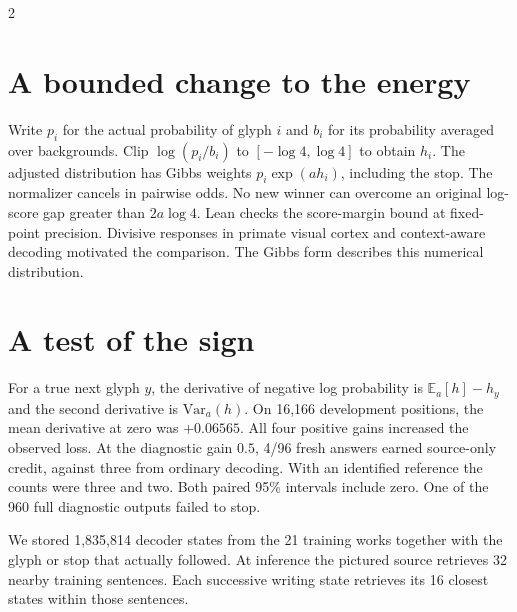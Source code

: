 \begin{multicols}{2}
\section*{A bounded change to the energy}
Write $p_i$ for the actual probability of glyph $i$ and $b_i$ for its probability averaged over backgrounds. Clip $\log(p_i/b_i)$ to $[-\log 4,\log 4]$ to obtain $h_i$. The adjusted distribution has Gibbs weights $p_i\exp(a h_i)$, including the stop. The normalizer cancels in pairwise odds. No new winner can overcome an original log-score gap greater than $2a\log 4$. Lean checks the score-margin bound at fixed-point precision. Divisive responses in primate visual cortex and context-aware decoding motivated the comparison. The Gibbs form describes this numerical distribution.
\section*{A test of the sign}
For a true next glyph $y$, the derivative of negative log probability is $\mathbb{E}_{a}[h]-h_y$ and the second derivative is $\mathrm{Var}_{a}(h)$. On 16,166 development positions, the mean derivative at zero was $+0.06565$. All four positive gains increased the observed loss. At the diagnostic gain $0.5$, 4/96 fresh answers earned source-only credit, against three from ordinary decoding. With an identified reference the counts were three and two. Both paired 95\% intervals include zero. One of the 960 full diagnostic outputs failed to stop.
\end{multicols}
\newpage
{}
\noindent We stored 1,835,814 decoder states from the 21 training works together with the glyph or stop that actually followed. At inference the pictured source retrieves 32 nearby training sentences. Each successive writing state retrieves its 16 closest states within those sentences.
